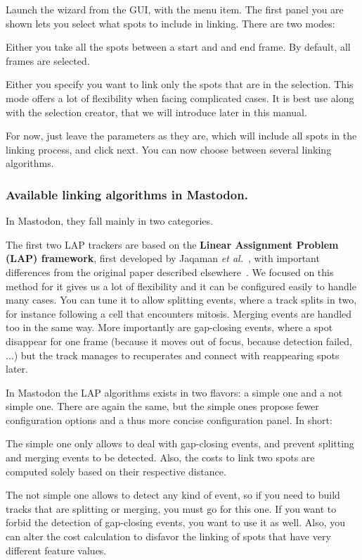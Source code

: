 Launch the wizard from the GUI, with the  menu item. 
The first panel you are shown lets you select what spots to include in linking. 
There are two modes:
\begin{myitemize}
    \item Either you take all the spots between a start and and end frame. By default, all frames are selected.
    \item Either you specify you want to link only the spots that are in the selection. 
    This mode offers a lot of flexibility when facing complicated cases. 
    It is best use along with the selection creator, that we will introduce later in this manual.
\end{myitemize}
For now, just leave the parameters as they are, which will include all spots in the linking process, and click next.
You can now choose between several linking algorithms. 

\subsubsection{Available linking algorithms in Mastodon.}

In Mastodon, they fall mainly in two categories.

The first two LAP trackers are based on the \textbf{Linear Assignment Problem (LAP) framework}, first developed by Jaqaman \textit{et al.}~\cite{Jaqaman2008}, with important differences from the original paper described elsewhere~\cite{TrackMate}. 
We focused on this method for it gives us a lot of flexibility and it can be configured easily to handle many cases. 
You can tune it to allow splitting events, where a track splits in two, for instance following a cell that encounters mitosis. 
Merging events are handled too in the same way. More importantly are gap-closing events, where a spot disappear for one frame (because it moves out of focus, because detection failed, ...) but the track manages to recuperates and connect with reappearing spots later.

In Mastodon the LAP algorithms exists in two flavors: a simple one and a not simple one. There are again the same, but the simple ones propose fewer configuration options and a thus more concise configuration panel. In short:
\begin{myitemize}
    \item The simple one only allows to deal with gap-closing events, and prevent splitting and merging events to be detected. Also, the costs to link two spots are computed solely based on their respective distance.
    
    \item The not simple one allows to detect any kind of event, so if you need to build tracks that are splitting or merging, you must go for this one. If you want to forbid the detection of gap-closing events, you want to use it as well. Also, you can alter the cost calculation to disfavor the linking of spots that have very different feature values.
\end{myitemize}

